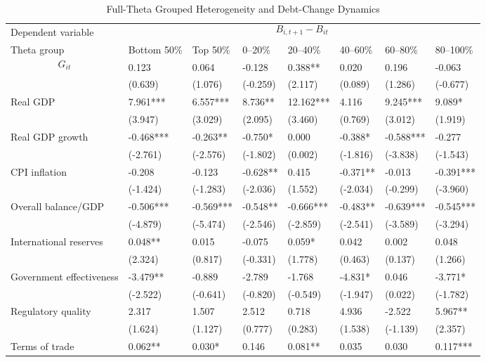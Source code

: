 \begin{table}[H]\centering
\begin{threeparttable}
\caption{Full-Theta Grouped Heterogeneity and Debt-Change Dynamics}
\label{tab:theta_group_heterogeneity_debt}
\scriptsize
\begin{tabularx}{\textwidth}{lYYYYYYY}
\toprule
Dependent variable &  \\
\cmidrule(lr){2-8}
Theta group & Bottom 50\% & Top 50\% & 0--20\% & 20--40\% & 40--60\% & 60--80\% & 80--100\% \\
\midrule
$$G_{it}$$ & 0.123 & 0.064 & -0.128 & 0.388** & 0.020 & 0.196 & -0.063 \\
  & (0.639) & (1.076) & (-0.259) & (2.117) & (0.089) & (1.286) & (-0.677) \\
Real GDP & 7.961*** & 6.557*** & 8.736** & 12.162*** & 4.116 & 9.245*** & 9.089* \\
  & (3.947) & (3.029) & (2.095) & (3.460) & (0.769) & (3.012) & (1.919) \\
Real GDP growth & -0.468*** & -0.263** & -0.750* & 0.000 & -0.388* & -0.588*** & -0.277 \\
  & (-2.761) & (-2.576) & (-1.802) & (0.002) & (-1.816) & (-3.838) & (-1.543) \\
CPI inflation & -0.208 & -0.123 & -0.628** & 0.415 & -0.371** & -0.013 & -0.391*** \\
  & (-1.424) & (-1.283) & (-2.036) & (1.552) & (-2.034) & (-0.299) & (-3.960) \\
Overall balance/GDP & -0.506*** & -0.569*** & -0.548** & -0.666*** & -0.483** & -0.639*** & -0.545*** \\
  & (-4.879) & (-5.474) & (-2.546) & (-2.859) & (-2.541) & (-3.589) & (-3.294) \\
International reserves & 0.048** & 0.015 & -0.075 & 0.059* & 0.042 & 0.002 & 0.048 \\
  & (2.324) & (0.817) & (-0.331) & (1.778) & (0.463) & (0.137) & (1.266) \\
Government effectiveness & -3.479** & -0.889 & -2.789 & -1.768 & -4.831* & 0.046 & -3.771* \\
  & (-2.522) & (-0.641) & (-0.820) & (-0.549) & (-1.947) & (0.022) & (-1.782) \\
Regulatory quality & 2.317 & 1.507 & 2.512 & 0.718 & 4.936 & -2.522 & 5.967** \\
  & (1.624) & (1.127) & (0.777) & (0.283) & (1.538) & (-1.139) & (2.357) \\
Terms of trade & 0.062** & 0.030* & 0.146 & 0.081** & 0.035 & 0.030 & 0.117*** \\

\end{tabularx}
\end{threeparttable}
\end{table}
